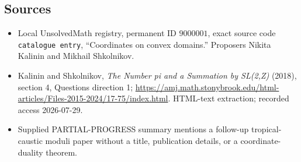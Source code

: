\documentclass[11pt]{article}
\begin{document}
\subsection{Sources}
\begin{itemize}
\item Local UnsolvedMath registry, permanent ID \(9000001\), exact source code \texttt{catalogue entry}, ``Coordinates on convex domains.'' Proposers Nikita Kalinin and Mikhail Shkolnikov.
\item Kalinin and Shkolnikov, \emph{The Number pi and a Summation by SL(2,Z)} (2018), section 4, Questions direction 1; \url{https://amj.math.stonybrook.edu/html-articles/Files-2015-2024/17-75/index.html}. HTML-text extraction; recorded access 2026-07-29.
\item Supplied PARTIAL-PROGRESS summary mentions a follow-up tropical-caustic moduli paper without a title, publication details, or a coordinate-duality theorem.
\end{itemize}
\end{document}
